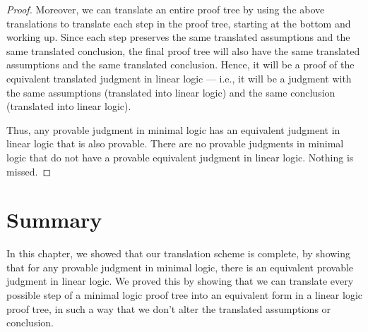 \documentclass[../../../main.tex]{subfiles}
\begin{document}
\begin{proof}

\noindent
Moreover, we can translate an entire proof tree by using the above translations to translate each step in the proof tree, starting at the bottom and working up. Since each step preserves the same translated assumptions and the same translated conclusion, the final proof tree will also have the same translated assumptions and the same translated conclusion. Hence, it will be a proof of the equivalent translated judgment in linear logic --- i.e., it will be a judgment with the same assumptions (translated into linear logic) and the same conclusion (translated into linear logic).

Thus, any provable judgment in minimal logic has an equivalent judgment in linear logic that is also provable. There are no provable judgments in minimal logic that do not have a provable equivalent judgment in linear logic. Nothing is missed.
\end{proof}


\section{Summary}

In this chapter, we showed that our translation scheme is complete, by showing that for any provable judgment in minimal logic, there is an equivalent provable judgment in linear logic. We proved this by showing that we can translate every possible step of a minimal logic proof tree into an equivalent form in a linear logic proof tree, in such a way that we don't alter the translated assumptions or conclusion.
\end{document}
